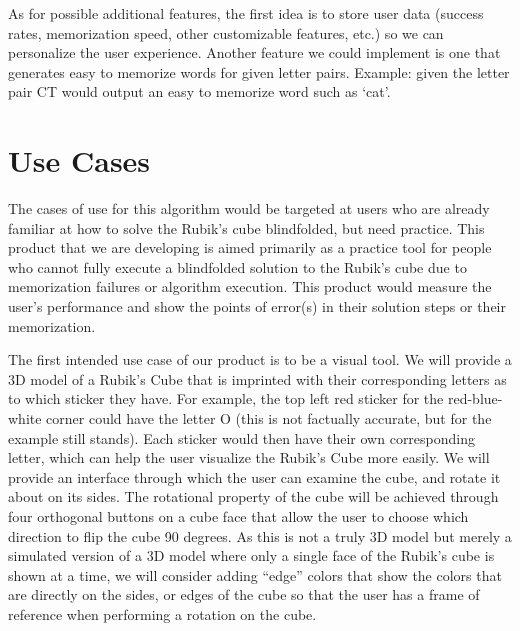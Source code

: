 \documentclass[12pt]{article}
\begin{document}
\par
As for possible additional features, the first idea is to store user data (success rates, memorization speed, other customizable features, etc.) so we can personalize the user experience. Another feature we could implement is one that generates easy to memorize words for given letter pairs. Example: given the letter pair CT would output an easy to memorize word such as ‘cat’.

\section{Use Cases}

\par
The cases of use for this algorithm would be targeted at users who are already familiar at how to solve the Rubik’s cube blindfolded, but need practice. This product that we are developing is aimed primarily as a practice tool for people who cannot fully execute a blindfolded solution to the Rubik’s cube due to memorization failures or algorithm execution. This product would measure the user’s performance and show the points of error(s) in their solution steps or their memorization.

\par
The first intended use case of our product is to be a visual tool. We will provide a 3D model of a Rubik’s Cube that is imprinted with their corresponding letters as to which sticker they have. For example, the top left red sticker for the red-blue-white corner could have the letter O (this is not factually accurate, but for the example still stands). Each sticker would then have their own corresponding letter, which can help the user visualize the Rubik’s Cube more easily. We will provide an interface through which the user can examine the cube, and rotate it about on its sides. The rotational property of the cube will be achieved through four orthogonal buttons on a cube face that allow the user to choose which direction to flip the cube 90 degrees. As this is not a truly 3D model but merely a simulated version of a 3D model where only a single face of the Rubik’s cube is shown at a time, we will consider adding “edge” colors that show the colors that are directly on the sides, or edges of the cube so that the user has a frame of reference when performing a rotation on the cube.
\end{document}
